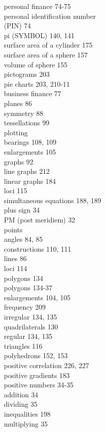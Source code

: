 \documentclass[10pt]{article}
\begin{document}
personal finance 74-75\\
personal identification number\\
(PIN) 74\\
pi (SYMBOL) 140, 141\\
surface area of a cylinder 175\\
surface area of a sphere 157\\
volume of sphere 155\\
pictograms 203\\
pie charts 203, 210-11\\
business finance 77\\
planes 86\\
symmetry 88\\
tessellations 99\\
plotting\\
bearings 108, 109\\
enlargements 105\\
graphs 92\\
line graphs 212\\
linear graphs 184\\
loci 115\\
simultaneous equations 188, 189\\
plus sign 34\\
PM (post meridiem) 32\\
points\\
angles 84, 85\\
constructions 110, 111\\
lines 86\\
loci 114\\
polygons 134\\
polygons 134-37\\
enlargements 104, 105\\
frequency 209\\
irregular 134, 135\\
quadrilaterals 130\\
regular 134, 135\\
triangles 116\\
polyhedrons 152, 153\\
positive correlation 226, 227\\
positive gradients 183\\
positive numbers 34-35\\
addition 34\\
dividing 35\\
inequalities 198\\
multiplying 35\\
\end{document}
